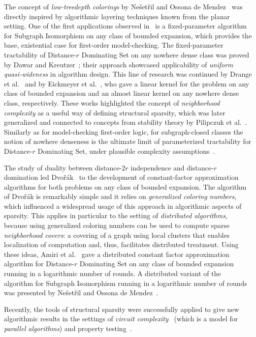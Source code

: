 The concept of {\em{low-treedepth colorings}} by Ne\v{s}et\v{r}il and Ossona de Mendez~\cite{NesetrilM08a} was directly inspired by algorithmic layering techniques known from the planar setting.
One of the first applications observed in~\cite{NesetrilM08a} is a fixed-parameter algorithm for Subgraph Isomorphism on any class of bounded expansion, 
which provides the base, existential case for first-order model-checking. 
The fixed-parameter tractability of Distance-$r$ Dominating Set on any nowhere dense class was proved by Dawar and Kreutzer~\cite{DawarK09}; 
their approach showcased applicability of {\em{uniform quasi-wideness}} in algorithm design.
This line of research was continued by Drange et al.~\cite{DrangeDFKLPPRVS16} and by Eickmeyer et al.~\cite{eickmeyer2016neighborhood}, who gave a linear kernel for the problem on any class of bounded expansion
and an almost linear kernel on any nowhere dense class, respectively.
These works highlighted the concept of {\em{neighborhood complexity}} as a useful way of defining structural sparsity, 
which was later generalized and connected to concepts from stability theory by Pilipczuk et al.~\cite{pilipczuk2018number}.
Similarly as for model-checking first-order logic, for subgraph-closed classes the notion of nowhere denseness is the ultimate limit of parameterized tractability for Distance-$r$ Dominating Set,
under plausible complexity assumptions~\cite{DrangeDFKLPPRVS16}.

The study of duality between distance-$2r$ independence and distance-$r$ domination led Dvo\v{r}\'ak~\cite{Dvorak13}
to the development of constant-factor approximation algorithms for both problems on any class of bounded expansion.
The algorithm of Dvo\v{r}\'ak is remarkably simple and it relies on {\em{generalized coloring numbers}}, which influenced a widespread usage of this approach in algorithmic aspects of sparsity.
This applies in particular to the setting of {\em{distributed algorithms}}, because using generalized coloring numbers can be used to compute sparse {\em{neighborhood covers}}: 
a covering of a graph using local clusters that enables localization of computation and, thus, facilitates distributed treatment.
Using these ideas, Amiri et al.~\cite{AmiriMRS18} gave a distributed constant factor approximation algorithm for Distance-$r$ Dominating Set on any class of bounded expansion running in a logarithmic number of rounds.
A distributed variant of the algorithm for Subgraph Isomorphism running in a logarithmic number of rounds was presented by Ne\v{s}et\v{r}il and Ossona de Mendez~\cite{NesetrilM16}.

Recently, the tools of structural sparsity were successfully applied to give new algorithmic results in the settings of {\em{circuit complexity}}~\cite{PilipczukST18} 
(which is a model for {\em{parallel algorithms}}) and property testing~\cite{AdlerH18}.


